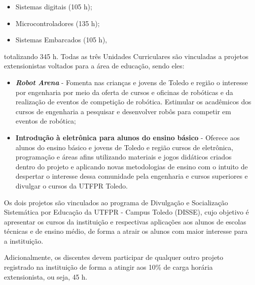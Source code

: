 \begin{itemize}
    \item Sistemas digitais (105 h);
    \item Microcontroladores (135 h);
    \item Sistemas Embarcados (105 h),
\end{itemize}

\noindent totalizando 345 h. Todas as três Unidades Curriculares são vinculadas a projetos extensionistas voltados para a área de educação, sendo eles:

\begin{itemize}
    \item \textbf{\textit{Robot Arena}} - Fomenta nas crianças e jovens de Toledo e região o interesse por engenharia por meio da oferta de cursos e oficinas de robóticas e da realização de eventos de competição de robótica. Estimular os acadêmicos dos cursos de engenharia a pesquisar e desenvolver robôs para competir em eventos de robótica;
    \item \textbf{Introdução à eletrônica para alunos do ensino básico} - Oferece aos alunos do ensino básico e jovens de Toledo e região cursos de eletrônica, programação e áreas afins utilizando materiais e jogos didáticos criados dentro do projeto e aplicando novas metodologias de ensino com o intuito de despertar o interesse dessa comunidade pela engenharia e cursos superiores e divulgar o cursos da UTFPR Toledo.
\end{itemize}

Os dois projetos são vinculados ao programa de Divulgação e Socialização Sistemática por Educação da UTFPR - Campus Toledo (DISSE), cujo objetivo é apresentar os cursos da instituição e respectivas aplicações aos alunos de escolas técnicas e de ensino médio, de forma a atrair os alunos com maior interesse para a instituição.


Adicionalmente, os discentes devem participar de qualquer outro projeto registrado na instituição de forma a atingir aos 10\% de carga horária extensionista, ou seja, 45 h. 
